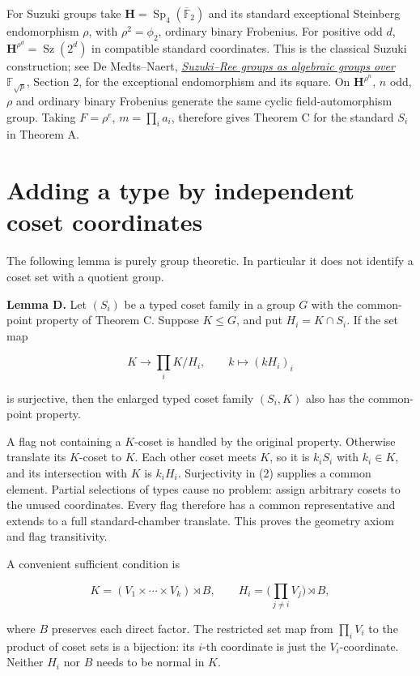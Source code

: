\documentclass[11pt,a4paper]{article}
\begin{document}
For Suzuki groups take \(\mathbf H=\operatorname{Sp}_4(\overline{\mathbb
F}_2)\) and its standard exceptional Steinberg endomorphism \(\rho\),
with \(\rho^2=\phi_2\), ordinary binary Frobenius. For positive odd
\(d\), \(\mathbf H^{\rho^d}=\operatorname{Sz}(2^d)\) in compatible
standard coordinates. This is the classical Suzuki construction; see De
Medts--Naert, \href{https://arxiv.org/abs/1904.10741}{\emph{Suzuki--Ree
groups as algebraic groups over \(\mathbb F_{\sqrt p}\)}}, Section 2,
for the exceptional endomorphism and its square. On
\(\mathbf H^{\rho^n}\), \(n\) odd, \(\rho\) and ordinary binary
Frobenius generate the same cyclic field-automorphism group. Taking
\(F=\rho^e\), \(m=\prod_i a_i\), therefore gives Theorem C for the
standard \(S_i\) in Theorem A.

\section{Adding a type by independent coset
coordinates}\label{adding-a-type-by-independent-coset-coordinates}

The following lemma is purely group theoretic. In particular it does not
identify a coset set with a quotient group.

\textbf{Lemma D.} Let \((S_i)\) be a typed coset family in a group \(G\)
with the common-point property of Theorem C. Suppose \(K\le G\), and put
\(H_i=K\cap S_i\). If the set map

\[
K\longrightarrow\prod_i K/H_i,\qquad
k\longmapsto(kH_i)_i
\tag{2}
\]

is surjective, then the enlarged typed coset family \((S_i,K)\) also has
the common-point property.

A flag not containing a \(K\)-coset is handled by the original property.
Otherwise translate its \(K\)-coset to \(K\). Each other coset meets
\(K\), so it is \(k_iS_i\) with \(k_i\in K\), and its intersection with
\(K\) is \(k_iH_i\). Surjectivity in (2) supplies a common element.
Partial selections of types cause no problem: assign arbitrary cosets to
the unused coordinates. Every flag therefore has a common representative
and extends to a full standard-chamber translate. This proves the
geometry axiom and flag transitivity.

A convenient sufficient condition is

\[
K=(V_1\times\cdots\times V_k)\rtimes B,\qquad
H_i=\Big(\prod_{j\ne i}V_j\Big)\rtimes B,
\tag{3}
\]

where \(B\) preserves each direct factor. The restricted set map from
\(\prod_iV_i\) to the product of coset sets is a bijection: its \(i\)-th
coordinate is just the \(V_i\)-coordinate. Neither \(H_i\) nor \(B\)
needs to be normal in \(K\).
\end{document}
